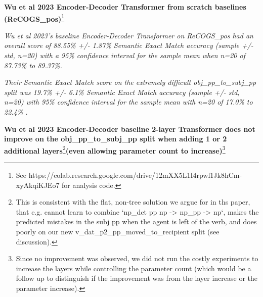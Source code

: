 \documentclass[11pt]{article}
\begin{document}
\textbf{Wu et al 2023 Encoder-Decoder Transformer from scratch baselines (ReCOGS\_pos)}\footnote{
See https://colab.research.google.com/drive/12mXX5L1I4rpwl1Jk8hCm-xyAkqiKJEo7 for analysis code.
}

\textit{Wu et al 2023's baseline Encoder-Decoder Transformer on ReCOGS\_pos had an overall score of  88.55\% +/- 1.87\% Semantic Exact Match accuracy (sample +/- std, n=20) with a 95\% confidence interval for the sample mean when n=20 of 87.73\% to 89.37\%.}

\textit{Their Semantic Exact Match score on the extremely difficult obj\_pp\_to\_subj\_pp split was 19.7\% +/- 6.1\% Semantic Exact Match accuracy (sample +/- std, n=20) with 95\% confidence interval for the sample mean with n=20 of 17.0\% to 22.4\% .}


\textbf{Wu et al 2023 Encoder-Decoder baseline 2-layer Transformer does not improve on the obj\_pp\_to\_subj\_pp split when adding 1 or 2 additional layers}\footnote{This is consistent with the flat, non-tree solution we argue for in ths paper, that e.g. cannot learn to combine `np\_det pp np -> np\_pp -> np`, makes the predicted mistakes in the subj pp when the agent is left of the verb, and does poorly on our new v\_dat\_p2\_pp\_moved\_to\_recipient split  (see discussion).}\textbf{(even allowing parameter count to increase)}\footnote{Since no improvement was observed, we did not run the costly experiments to increase the layers while controlling the parameter count (which would be a follow up to distinguish if the improvement was from the layer increase or the parameter increase).}
\end{document}
